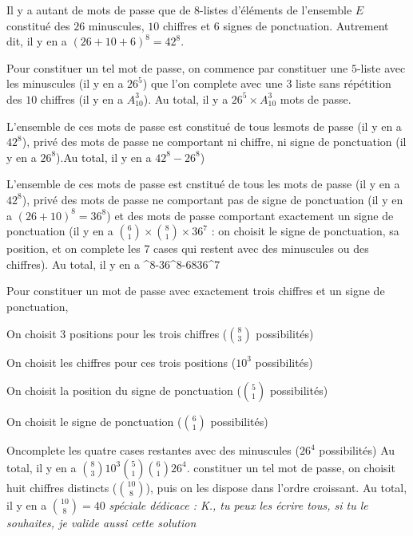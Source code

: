 {{\item%
\startList%
\item Il y a autant de mots de passe que de $8$-listes d'éléments de l'ensemble $E$ constitué des $26$ minuscules, $10$ chiffres et $6$ signes de ponctuation.
Autrement dit, il y en a $(26+10+6)^8=42^8$.
\item Pour constituer un tel mot de passe, on commence par constituer une $5$-liste avec les minuscules (il y en a $26^5$) que l'on complete avec une $3$ liste sans répétition des $10$ chiffres (il y en a $A_{10}^3$). 
Au total, il y a $26^5×A_{10}^3$ mots de passe.
\item L'ensemble de ces mots de passe est constitué de tous lesmots de passe (il y en a $42^8$), privé des mots de passe ne comportant ni chiffre, ni signe de ponctuation (il y en a $26^8$).Au total, il y en a $42^8-26^8$)
\item L'ensemble de ces mots de passe est cnstitué de tous les mots de passe (il y en a $42^8$), privé des mots de passe ne comportant pas de signe de ponctuation (il y en a $(26+10)^8=36^8$) et des mots de passe comportant exactement un signe de ponctuation (il y en a ${6\choose 1}×{8\choose 1}×36^7$ : on choisit le signe de ponctuation, sa position, et on complete les 7 cases qui restent avec des minuscules ou des chiffres).
Au total, il y en a 
^8-36^8-{6}{8}36^7
\stopformula
\item Pour constituer un mot de passe avec exactement trois chiffres et un signe de ponctuation,  
\startitemize[n]
\item On choisit $3$ positions pour les trois chiffres (${8\choose 3}$ possibilités)
\item On choisit les chiffres pour ces trois positions ($10^3$ possibilités)
\item On choisit la position du signe de ponctuation (${5\choose 1}$ possibilités)
\item On choisit le signe de ponctuation (${6\choose 1}$ possibilités)
\item Oncomplete les quatre cases restantes avec des minuscules ($26^4$ possibilités)
\stopitemize
Au total, il y en a $
{8\choose 3}10^3{5\choose 1}{6\choose 1}26^4$.
\itemPour constituer un tel mot de passe, on choisit huit chiffres distincts (${10\choose 8}$), puis on les dispose dans l'ordre croissant.
Au total, il y en a ${10\choose 8}=40$ {\it spéciale dédicace : K., tu peux les écrire tous, si tu le souhaites, je valide aussi cette solution}
\stopList%

}}
